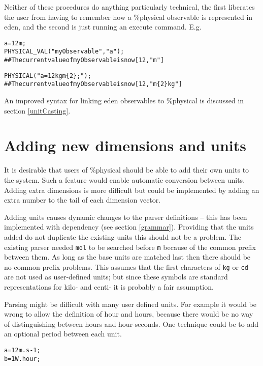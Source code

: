 \documentclass[a4paper]{article}
\begin{document}
Neither of these procedures do anything particularly technical, 
the first liberates the user from having to remember how a \%physical observable
is represented in eden, and the second is just running an execute command.
E.g.

\begin{alltt}
%physical
a = 12 m;
%eden
PHYSICAL_VAL("myObservable","a");
## The current value of myObservable is now [12,"m"]

PHYSICAL("a = 12 kgm\{2\};");
## The current value of myObservable is now [12,"m\{2\}kg"]

\end{alltt}

An improved syntax for linking eden observables to \%physical is discussed in 
section \ref{unitCasting}.


\section{Adding new dimensions and units \label{addingUnits}}

It is desirable that users of \%physical should be able to add their own units 
to the system. Such a feature would enable automatic conversion between units.
Adding extra dimensions is more difficult but could be implemented by adding an 
extra number to the
tail of each dimension vector.

Adding units causes dynamic changes to the parser definitions -- this has been 
implemented with dependency (see section
\ref{grammar}). Providing that the units added do not duplicate the existing 
units this should 
not be a problem. The existing parser needed \texttt{mol} to be searched before
\texttt{m} because of the common prefix between them. As long as the base units 
are matched last then there should be
no common-prefix problems. This assumes that the first characters of 
\texttt{kg} or \texttt{cd} are not used as user-defined units; but since these 
symbols are standard representations for kilo- and
centi- it is probably a fair assumption. 

Parsing might be difficult with many user defined units. For example it would 
be wrong to allow
the definition of hour and hours, because there would be no way of 
distinguishing between hours and hour-seconds. One technique could be to add an 
optional period between each unit. 

\begin{alltt}
%physical
a = 12 m.s{-1};
b = 1 W.hour;
\end{alltt}
\end{document}
